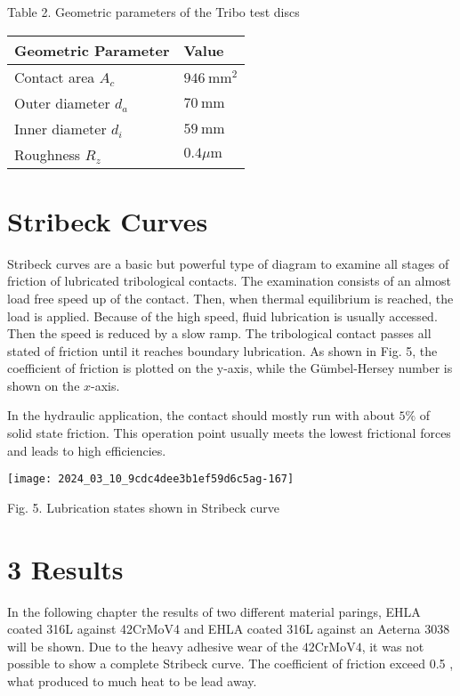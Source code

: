 \documentclass[10pt]{article}
\begin{document}
Table 2. Geometric parameters of the Tribo test discs

\begin{center}
\begin{tabular}{l|l}
\hline
Geometric Parameter & Value \\
\hline
Contact area $A_{c}$ & $946 \mathrm{~mm}^{2}$ \\
\hline
Outer diameter $d_{a}$ & $70 \mathrm{~mm}$ \\
\hline
Inner diameter $d_{i}$ & $59 \mathrm{~mm}$ \\
\hline
Roughness $R_{z}$ & $0.4 \mu \mathrm{m}$ \\
\hline
\end{tabular}
\end{center}

\section*{Stribeck Curves}
Stribeck curves are a basic but powerful type of diagram to examine all stages of friction of lubricated tribological contacts. The examination consists of an almost load free speed up of the contact. Then, when thermal equilibrium is reached, the load is applied. Because of the high speed, fluid lubrication is usually accessed. Then the speed is reduced by a slow ramp. The tribological contact passes all stated of friction until it reaches boundary lubrication. As shown in Fig. 5, the coefficient of friction is plotted on the y-axis, while the Gümbel-Hersey number is shown on the $x$-axis.

In the hydraulic application, the contact should mostly run with about $5 \%$ of solid state friction. This operation point usually meets the lowest frictional forces and leads to high efficiencies.

\begin{center}
\texttt{[image: 2024\_03\_10\_9cdc4dee3b1ef59d6c5ag-167]}
\end{center}

Fig. 5. Lubrication states shown in Stribeck curve

\section*{3 Results}
In the following chapter the results of two different material parings, EHLA coated 316L against 42CrMoV4 and EHLA coated 316L against an Aeterna 3038 will be shown. Due to the heavy adhesive wear of the $42 \mathrm{CrMoV} 4$, it was not possible to show a complete Stribeck curve. The coefficient of friction exceed 0.5 , what produced to much heat to be lead away.
\end{document}
